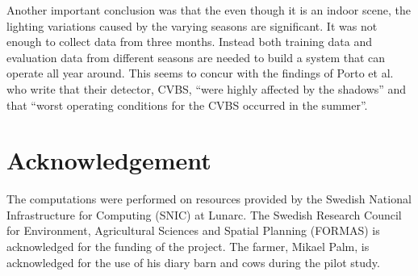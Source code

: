 \documentclass{cta-author}
\begin{document}
Another important conclusion was that the even though it is an indoor scene, the lighting variations caused
by the varying seasons are significant. It was not enough to collect data from three months. Instead both
training data and evaluation data from different seasons are needed to build a system that can operate all
year around. This seems to concur with the findings of Porto et al. \cite{porto2015automatic} who write that
their detector, CVBS,
``were highly affected by the shadows'' and that ``worst operating
conditions for the CVBS occurred in the summer''.


\section{Acknowledgement}
The computations were performed on resources provided by the Swedish National Infrastructure for Computing
(SNIC) at Lunarc. The Swedish Research Council for Environment, Agricultural Sciences and
Spatial Planning (FORMAS) is acknowledged
for the funding of the project. The farmer, Mikael Palm, is acknowledged for the use of his diary barn and
cows during the pilot study.




{\parindent0pt
\parskip8pt

}
\end{document}
